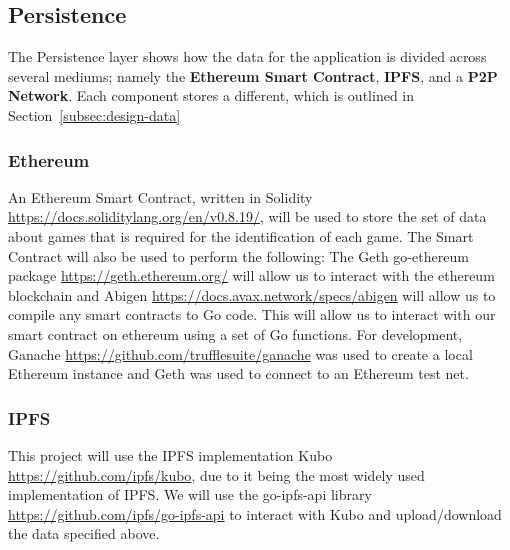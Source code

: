 
\subsection{Persistence}

The Persistence layer shows how the data for the application is divided across several mediums; namely the \textbf{Ethereum Smart Contract}, \textbf{IPFS}, and a \textbf{P2P Network}. Each component stores a different, which is outlined in Section~\ref{subsec:design-data}

\subsubsection*{Ethereum}\label{subsubsec:impl-eth}

An Ethereum Smart Contract, written in Solidity \url{https://docs.soliditylang.org/en/v0.8.19/}, will be used to store the set of data about games that is required for the identification of each game. The Smart Contract will also be used to perform the following:
\x
The Geth go-ethereum package \url{https://geth.ethereum.org/} will allow us to interact with the ethereum blockchain and Abigen \url{https://docs.avax.network/specs/abigen} will allow us to compile any smart contracts to Go code. This will allow us to interact with our smart contract on ethereum using a set of Go functions. For development, Ganache \url{https://github.com/trufflesuite/ganache} was used to create a local Ethereum instance and Geth was used to connect to an Ethereum test net.


\subsubsection*{IPFS}

This project will use the IPFS implementation Kubo \url{https://github.com/ipfs/kubo}, due to it being the most widely used implementation of IPFS. We will use the go-ipfs-api library \url{https://github.com/ipfs/go-ipfs-api} to interact with Kubo and upload/download the data specified above.

